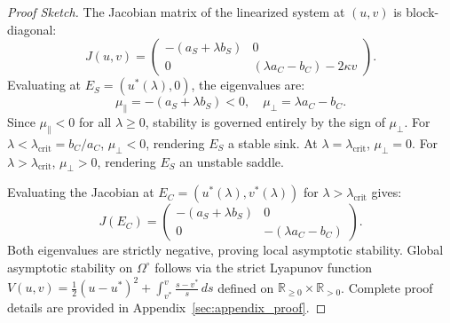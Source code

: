 \documentclass{article}
\theoremstyle{plain}
\theoremstyle{definition}
\begin{document}
\begin{proof}[Proof Sketch]
The Jacobian matrix of the linearized system at $(u, v)$ is block-diagonal:
\begin{equation}
    J(u, v) = \begin{pmatrix}
        -(a_S + \lambda b_S) & 0 \\
        0 & (\lambda a_C - b_C) - 2\kappa v
    \end{pmatrix}.
    \label{eq:jacobian}
\end{equation}
Evaluating at $E_S = (u^*(\lambda), 0)$, the eigenvalues are:
\begin{equation}
    \mu_{\parallel} = -(a_S + \lambda b_S) < 0, \quad \mu_{\perp} = \lambda a_C - b_C.
    \label{eq:eigenvalues_ES}
\end{equation}
Since $\mu_{\parallel} < 0$ for all $\lambda \ge 0$, stability is governed entirely by the sign of $\mu_{\perp}$. For $\lambda < \lambda_{\text{crit}} = b_C / a_C$, $\mu_{\perp} < 0$, rendering $E_S$ a stable sink. At $\lambda = \lambda_{\text{crit}}$, $\mu_{\perp} = 0$. For $\lambda > \lambda_{\text{crit}}$, $\mu_{\perp} > 0$, rendering $E_S$ an unstable saddle.

Evaluating the Jacobian at $E_C = (u^*(\lambda), v^*(\lambda))$ for $\lambda > \lambda_{\text{crit}}$ gives:
\begin{equation}
    J(E_C) = \begin{pmatrix}
        -(a_S + \lambda b_S) & 0 \\
        0 & -(\lambda a_C - b_C)
    \end{pmatrix}.
    \label{eq:jacobian_EC}
\end{equation}
Both eigenvalues are strictly negative, proving local asymptotic stability. Global asymptotic stability on $\Omega^\circ$ follows via the strict Lyapunov function $V(u, v) = \frac{1}{2}(u - u^*)^2 + \int_{v^*}^v \frac{s - v^*}{s} \, ds$ defined on $\mathbb{R}_{\ge 0} \times \mathbb{R}_{> 0}$. Complete proof details are provided in Appendix~\ref{sec:appendix_proof}.
\end{proof}
\end{document}
